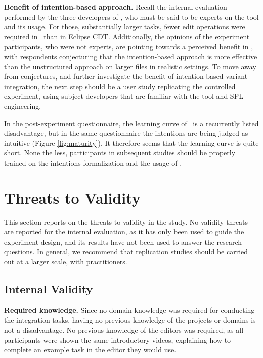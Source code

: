 \textbf{Benefit of intention-based approach.} Recall the internal evaluation performed by the three developers of \tooln, who must be said to be experts on the tool and its usage. For those, substantially larger tasks, fewer edit operations were required in \tooln~than in Eclipse CDT. Additionally, the opinions of the experiment participants, who were not experts, are pointing towards a perceived benefit in \tooln, with respondents conjecturing that the intention-based approach is more effective than the unstructured approach on larger files in realistic settings. To move away from conjectures, and further investigate the benefit of intention-based variant integration, the next step should be a user study replicating the controlled experiment, using subject developers that are familiar with the tool and SPL engineering.

In the post-experiment questionnaire, the learning curve of \tooln~is a recurrently listed disadvantage, but in the same questionnaire the intentions are being judged as intuitive (Figure \ref{fig:maturity}). It therefore seems that the learning curve is quite short. None the less, participants in subsequent studies should be properly trained on the intentions formalization and the usage of \tooln.

\section{Threats to Validity}
This section reports on the threats to validity in the study. No validity threats are reported for the internal evaluation, as it has only been used to guide the experiment design, and its results have not been used to answer the research questions. In general, we recommend that replication studies should be carried out at a larger scale, with practitioners. 

\subsection{Internal Validity}
\textbf{Required knowledge.} 
Since no domain knowledge was required for conducting the integration tasks, having no previous knowledge of the projects or domains is not a disadvantage. No previous knowledge of the editors was required, as all participants were shown the same introductory videos, explaining how to complete an example task in the editor they would use.


